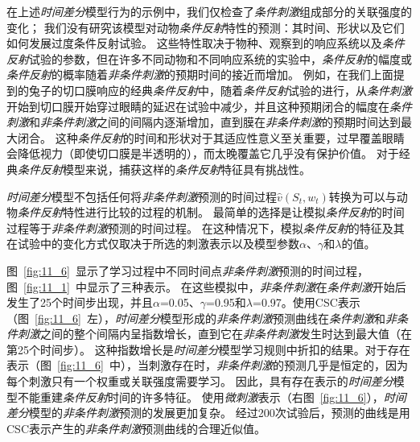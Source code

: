 在上述\textit{时间差分}模型行为的示例中，我们仅检查了\textit{条件刺激}组成部分的关联强度的变化；
我们没有研究该模型对动物\textit{条件反射}特性的预测：其时间、形状以及它们如何发展过度条件反射试验。
这些特性取决于物种、观察到的响应系统以及\textit{条件反射}试验的参数，但在许多不同动物和不同响应系统的实验中，\textit{条件反射}的幅度或\textit{条件反射}的概率随着\textit{非条件刺激}的预期时间的接近而增加。
例如，在我们上面提到的兔子的切口膜响应的经典\textit{条件反射}中，随着\textit{条件反射}试验的进行，从\textit{条件刺激}开始到切口膜开始穿过眼睛的延迟在试验中减少，并且这种预期闭合的幅度在\textit{条件刺激}和\textit{非条件刺激}之间的间隔内逐渐增加，直到膜在\textit{非条件刺激}的预期时间达到最大闭合。
这种\textit{条件反射}的时间和形状对于其适应性意义至关重要，过早覆盖眼睛会降低视力（即使切口膜是半透明的），而太晚覆盖它几乎没有保护价值。
对于经典\textit{条件反射}模型来说，捕获这样的\textit{条件反射}特征具有挑战性。


\textit{时间差分}模型不包括任何将\textit{非条件刺激}预测的时间过程$\hat v(S_t,w_t)$转换为可以与动物\textit{条件反射}特性进行比较的过程的机制。
最简单的选择是让模拟\textit{条件反射}的时间过程等于\textit{非条件刺激}预测的时间过程。
在这种情况下，模拟\textit{条件反射}的特征及其在试验中的变化方式仅取决于所选的刺激表示以及模型参数$\alpha$、$\gamma$和$\lambda$的值。


图~\ref{fig:11_6}~显示了学习过程中不同时间点\textit{非条件刺激}预测的时间过程，图~\ref{fig:11_1}~中显示了三种表示。
在这些模拟中，\textit{非条件刺激}在\textit{条件刺激}开始后发生了25个时间步出现，并且$\alpha$=0.05、$\gamma$=0.95和$\lambda$=0.97。使用CSC表示（图~\ref{fig:11_6}~左），\textit{时间差分}模型形成的\textit{非条件刺激}预测曲线在\textit{条件刺激}和\textit{非条件刺激}之间的整个间隔内呈指数增长，直到它在\textit{非条件刺激}发生时达到最大值（在第25个时间步）。
这种指数增长是\textit{时间差分}模型学习规则中折扣的结果。对于存在表示（图~\ref{fig:11_6}~中），当刺激存在时，\textit{非条件刺激}的预测几乎是恒定的，因为每个刺激只有一个权重或关联强度需要学习。
因此，具有存在表示的\textit{时间差分}模型不能重建\textit{条件反射}时间的许多特征。
使用\textit{微刺激}表示（右图~\ref{fig:11_6}），\textit{时间差分}模型的\textit{非条件刺激}预测的发展更加复杂。
经过200次试验后，预测的曲线是用CSC表示产生的\textit{非条件刺激}预测曲线的合理近似值。


